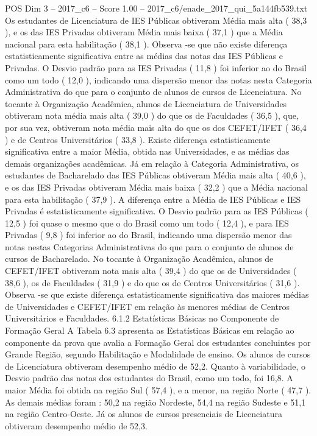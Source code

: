 \begin{textsample}{POS Dim 3 – 2017\_c6 – Score 1.00 – 2017\_c6/enade\_2017\_qui\_5a144fb539.txt}
Os estudantes de Licenciatura de IES Públicas obtiveram Média mais alta ( 38,3 ), e os das IES Privadas obtiveram Média mais baixa ( 37,1 ) que a Média nacional para esta habilitação ( 38,1 ).
Observa -se que não existe diferença estatisticamente significativa entre as médias das notas das IES Públicas e Privadas.
O Desvio padrão para as IES Privadas ( 11,8 ) foi inferior ao do Brasil como um todo ( 12,0 ), indicando uma dispersão menor das notas nesta Categoria Administrativa do que para o conjunto de alunos de cursos de Licenciatura.
No tocante à Organização Acadêmica, alunos de Licenciatura de Universidades obtiveram nota média mais alta ( 39,0 ) do que os de Faculdades ( 36,5 ), que, por sua vez, obtiveram nota média mais alta do que os dos CEFET/IFET ( 36,4 ) e de Centros Universitários ( 33,8 ).
Existe diferença estatisticamente significativa entre a maior Média, obtida nas Universidades, e as médias das demais organizações acadêmicas.
Já em relação à Categoria Administrativa, os estudantes de Bacharelado das IES Públicas obtiveram Média mais alta ( 40,6 ), e os das IES Privadas obtiveram Média mais baixa ( 32,2 ) que a Média nacional para esta habilitação ( 37,9 ).
A diferença entre a Média de IES Públicas e IES Privadas é estatisticamente significativa.
O Desvio padrão para as IES Públicas ( 12,5 ) foi quase o mesmo que o do Brasil como um todo ( 12,4 ), e para IES Privadas ( 9,8 ) foi inferior ao do Brasil, indicando uma dispersão menor das notas nestas Categorias Administrativas do que para o conjunto de alunos de cursos de Bacharelado.
No tocante à Organização Acadêmica, alunos de CEFET/IFET obtiveram nota mais alta ( 39,4 ) do que os de Universidades ( 38,6 ), os de Faculdades ( 31,9 ) e do que os de Centros Universitários ( 31,6 ).
Observa -se que existe diferença estatisticamente significativa das maiores médias de Universidades e CEFET/IFET em relação às menores médias de Centros Universitários e Faculdades. 6.1.2 Estatísticas Básicas no Componente de Formação Geral A Tabela 6.3 apresenta as Estatísticas Básicas em relação ao componente da prova que avalia a Formação Geral dos estudantes concluintes por Grande Região, segundo Habilitação e Modalidade de ensino.
Os alunos de cursos de Licenciatura obtiveram desempenho médio de 52,2.
Quanto à variabilidade, o Desvio padrão das notas dos estudantes do Brasil, como um todo, foi 16,8.
A maior Média foi obtida na região Sul ( 57,4 ), e a menor, na região Norte ( 47,7 ).
As demais médias foram : 50,2 na região Nordeste, 54,4 na região Sudeste e 51,1 na região Centro-Oeste.
Já os alunos de cursos presenciais de Licenciatura obtiveram desempenho médio de 52,3.

\end{textsample}

